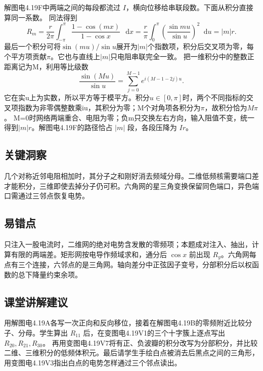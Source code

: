 \documentclass[UTF8,fontset=fandol,a4paper,11pt]{ctexart}
\newcommand{\dd}{\mathop{}\!\mathrm{d}}
\begin{document}
解图电4.19F中两端之间的每段都流过 $I$，横向位移给串联段数。下面从积分直接算同一系数。
同法得到
\[
R_m=\frac r{2\pi}\int_{-\pi}^{\pi}\frac{1-\cos(mx)}{1-\cos x}\,\dd x
=\frac r\pi\int_0^\pi\left(\frac{\sin mu}{\sin u}\right)^2\dd u
=|m|r.
\]
最后一个积分可将$\sin(mu)/\sin u$展开为$|m|$个指数项，积分后交叉项为零，每个平方项贡献$\pi$。它也与直线上$|m|$只电阻串联完全一致。
把一维积分中的整数正距离记为M，利用等比级数
\[
\frac{\sin(Mu)}{\sin u}=\sum_{j=0}^{M-1}e^{i(M-1-2j)u}.
\]
它在实u上为实数，所以平方等于模平方。积分$u\in[0,\pi]$时，两个不同指标的交叉项指数为非零偶整数乘iu，其积分为零；M个对角项各积分为$\pi$，故积分恰为$M\pi$。
M=0时网络两端重合、电阻为零；负m只交换左右方向，输入阻值不变，统一得到$|m|r$。解图电4.19F的路径恰占 $|m|$ 段，各段压降为 $Ir$。




\subsection*{关键洞察}

几个对称近邻电阻相加时，其分子之和刚好消去频域分母。二维低频核需要端口差才能积分，三维即使去掉分子仍可积。六角网的星三角变换保留同色端口，异色端口需通过三邻点恢复电势。



\subsection*{易错点}

只注入一股电流时，二维网的绝对电势含发散的零频项；本题成对注入、抽出，计算有限的两端差。矩形网按电导作频域求和，通分后 $\cos x$ 前出现 $R_y$。六角网每点有三个连接，六邻点的是三角网。轴向差分中正弦因子变号，分部积分后以权函数的总下降量约束余项。



\subsection*{课堂讲解建议}

用解图电4.19A各写一次正向和反向移位，接着在解图电4.19B的零频附近比较分子、分母。学生算出 $R_{11}$ 后，在变图电4.19V1的三个十字簇上逐点写出 $R_{20},R_{21},R_{30}$。
再用变图电4.19V7将有正、负波瓣的积分改写为分部积分，并比较二维、三维积分的低频体积元。最后请学生手绘白点被消去后黑点之间的三角形，用变图电4.19V3指出白点的电势怎样通过三个邻点读出。
\end{document}
